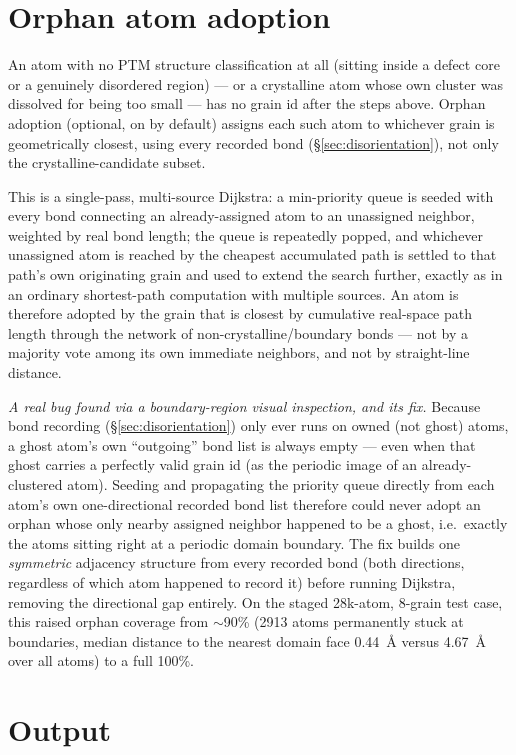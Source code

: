 \documentclass[11pt,a4paper]{article}
\begin{document}
\section{Orphan atom adoption}
\label{sec:orphan}

An atom with no PTM structure classification at all (sitting inside a defect core or a genuinely
disordered region) — or a crystalline atom whose own cluster was dissolved for being too small — has
no grain id after the steps above. Orphan adoption (optional, on by default) assigns each such atom
to whichever grain is geometrically closest, using every recorded bond (\S\ref{sec:disorientation}),
not only the crystalline-candidate subset.

This is a single-pass, multi-source Dijkstra: a min-priority queue is seeded with every bond
connecting an already-assigned atom to an unassigned neighbor, weighted by real bond length; the
queue is repeatedly popped, and whichever unassigned atom is reached by the cheapest accumulated
path is settled to that path's own originating grain and used to extend the search further, exactly
as in an ordinary shortest-path computation with multiple sources. An atom is therefore adopted by
the grain that is closest by cumulative real-space path length through the network of
non-crystalline/boundary bonds — not by a majority vote among its own immediate neighbors, and not
by straight-line distance.

\emph{A real bug found via a boundary-region visual inspection, and its fix.} Because bond recording
(\S\ref{sec:disorientation}) only ever runs on owned (not ghost) atoms, a ghost atom's own ``outgoing''
bond list is always empty — even when that ghost carries a perfectly valid grain id (as the
periodic image of an already-clustered atom). Seeding and propagating the priority queue directly
from each atom's own one-directional recorded bond list therefore could never adopt an orphan whose
only nearby assigned neighbor happened to be a ghost, i.e.\ exactly the atoms sitting right at a
periodic domain boundary. The fix builds one \emph{symmetric} adjacency structure from every
recorded bond (both directions, regardless of which atom happened to record it) before running
Dijkstra, removing the directional gap entirely. On the staged 28k-atom, 8-grain test case, this
raised orphan coverage from $\sim$90\% (2913 atoms permanently stuck at boundaries, median distance
to the nearest domain face 0.44~\AA{} versus 4.67~\AA{} over all atoms) to a full 100\%.

\section{Output}
\end{document}
